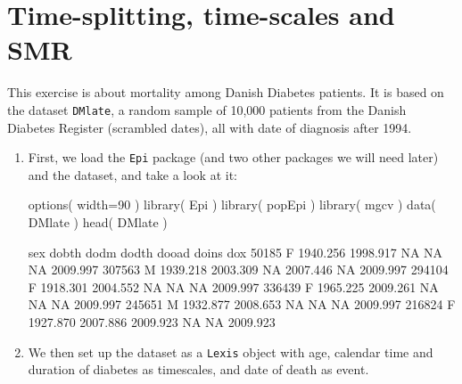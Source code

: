 



\renewcommand{\rwpre}{./graph/DMDK}
\section{Time-splitting, time-scales and SMR}

This exercise is about mortality among Danish Diabetes patients. It is
based on the dataset \texttt{DMlate}, a random sample of 10,000
patients from the Danish Diabetes Register (scrambled dates), all
with date of diagnosis after 1994.

\begin{enumerate}


\item First, we load the \texttt{Epi} package (and two other packages
  we will need later) and the dataset, and take a look at it:
\begin{Schunk}
\begin{Sinput}
 options( width=90 )
 library( Epi )
 library( popEpi )
 library( mgcv )
 data( DMlate )
 head( DMlate )
\end{Sinput}
\begin{Soutput}
       sex    dobth     dodm    dodth    dooad doins      dox
50185    F 1940.256 1998.917       NA       NA    NA 2009.997
307563   M 1939.218 2003.309       NA 2007.446    NA 2009.997
294104   F 1918.301 2004.552       NA       NA    NA 2009.997
336439   F 1965.225 2009.261       NA       NA    NA 2009.997
245651   M 1932.877 2008.653       NA       NA    NA 2009.997
216824   F 1927.870 2007.886 2009.923       NA    NA 2009.923
\end{Soutput}
\end{Schunk}


\item We then set up the dataset as a \texttt{Lexis} object with age, calendar
  time and duration of diabetes as timescales, and date of death as
  event.


\end{enumerate}
